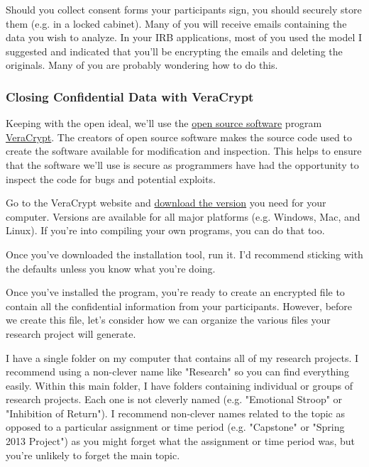 \documentclass[12pt]{article}
\begin{document}
Should you collect consent forms your participants sign, you should securely store them (e.g.
in a locked cabinet). Many of you will receive emails containing the data you wish to analyze.
In your IRB applications, most of you used the model I suggested and indicated that you'll be
encrypting the emails and deleting the originals. Many of you are probably wondering how to do
this.

\subsubsection{Closing Confidential Data with VeraCrypt}
Keeping with the open ideal, we'll use the
\href{http://en.wikipedia.org/wiki/Open-source_software}{open source software} program
\href{https://veracrypt.codeplex.com/wikipage?title=Downloads}{VeraCrypt}. The creators of
open source software makes the source code used to create the software available for modification
and inspection. This helps to ensure that the software we'll use is secure as programmers have
had the opportunity to inspect the code for bugs and potential exploits.

Go to the VeraCrypt website and \href{https://veracrypt.codeplex.com/wikipage?title=Downloads}
{download the version} you need for your computer. Versions
are available for all major platforms (e.g. Windows, Mac, and Linux). If you're into compiling
your own programs, you can do that too.

Once you've downloaded the installation tool, run it. I'd recommend sticking with the defaults
unless you know what you're doing.

Once you've installed the program, you're ready to create an encrypted file to contain all the
confidential information from your participants. However, before we create this file, let's
consider how we can organize the various files your research project will generate.

I have a single folder on my computer that contains all of my research projects. I recommend
using a non-clever name like "Research" so you can find everything easily. Within this main
folder, I have folders containing individual or groups of research projects. Each one is
not cleverly named (e.g. "Emotional Stroop" or "Inhibition of Return"). I recommend non-clever
names related to the topic as opposed to a particular assignment or time period (e.g. 
"Capstone" or "Spring 2013 Project") as you might forget what the assignment or time period
was, but you're unlikely to forget the main topic.
\end{document}
